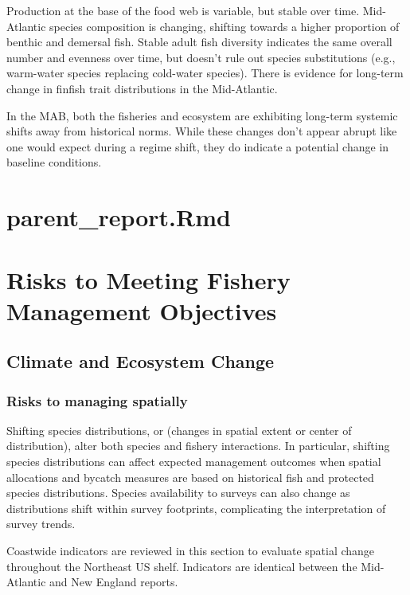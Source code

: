 \documentclass[
  10pt,
]{article}
\begin{document}
Production at the base of the food web is variable, but stable over time. Mid-Atlantic species composition is changing, shifting towards a higher proportion of benthic and demersal fish. Stable adult fish diversity indicates the same overall number and evenness over time, but doesn't rule out species substitutions (e.g., warm-water species replacing cold-water species). There is evidence for long-term change in finfish trait distributions in the Mid-Atlantic.

In the MAB, both the fisheries and ecosystem are exhibiting long-term systemic shifts away from historical norms. While these changes don't appear abrupt like one would expect during a regime shift, they do indicate a potential change in baseline conditions.

\section{parent\_report.Rmd}\label{parent_report.rmd-5}

\section{Risks to Meeting Fishery Management Objectives}\label{risks-to-meeting-fishery-management-objectives}

\subsection{Climate and Ecosystem Change}\label{climate-and-ecosystem-change}

\subsubsection{Risks to managing spatially}\label{risks-to-managing-spatially}

Shifting species distributions, or (changes in spatial extent or center of distribution), alter both species and fishery interactions. In particular, shifting species distributions can affect expected management outcomes when spatial allocations and bycatch measures are based on historical fish and protected species distributions. Species availability to surveys can also change as distributions shift within survey footprints, complicating the interpretation of survey trends.

Coastwide indicators are reviewed in this section to evaluate spatial change throughout the Northeast US shelf. Indicators are identical between the Mid-Atlantic and New England reports.
\end{document}
